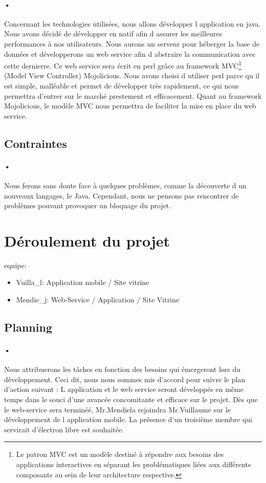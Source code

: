 \documentclass[pdftex,12pt,a4paper]{article}
\begin{document}
\paragraph{•}
Concernant les technologies utilis\'ees, nous allons d\'evelopper l application en java. Nous avons d\'ecid\'e de d\'evelopper en natif afin d assurer les meilleures performances à nos utilisateurs.
Nous aurons un serveur pour h\'eberger la base de donn\'ees et d\'evelopperons un web service afin d abstraire la communication avec cette dernierre. Ce web service sera \'ecrit en perl gr\^ace au framework MVC\footnote{ Le patron MVC est un mod\`ele destin\'e \`a r\'epondre aux besoins des applications interactives en s\'eparant les probl\'ematiques li\'ees aux diff\'erents composants au sein de leur architecture respective.} (Model View Controller) Mojolicious. Nous avons choisi d utiliser perl parce qu il est simple, mall\'eable et permet de développer tr\`es rapidement, ce qui nous permettra d’entrer sur le march\'e prestement et efficacement. 
Quant au framework Mojolicious, le mod\`ele MVC nous permettra de faciliter la mise en place du web service.

\subsection{Contraintes}
\paragraph{•}
Nous ferons sans doute face \`a quelques probl\`emes, comme la d\'ecouverte d un nouveaux langages, le Java. Cependant, nous ne pensons pas rencontrer de probl\`emes pouvant provoquer un bloquage du projet.

\section{D\'eroulement du projet}
equipe:
\begin{itemize}
\item Vuilla\_l: Application mobile / Site vitrine
\item Mendie\_j: Web-Service / Application / Site Vitrine
\end{itemize}

\subsection{Planning}
\paragraph{•}
Nous attribuerons les t\^aches en fonction des besoins qui \'emergeront lors du d\'eveloppement. Ceci dit, nous nous sommes mis d’accord pour suivre le plan d’action suivant : 
L application et le web service seront d\'evelopp\'es en m\^eme temps dans le souci d’une avanc\'ee concomitante et efficace sur le projet. D\`es que le web-service sera terminé\'e, Mr.Mendiela rejoindra Mr.Vuillaume sur le d\'eveloppement de l application mobile. La pr\'esence d’un troisi\`eme membre qui servirait d'\'electron libre est souhait\'ee.
\end{document}
